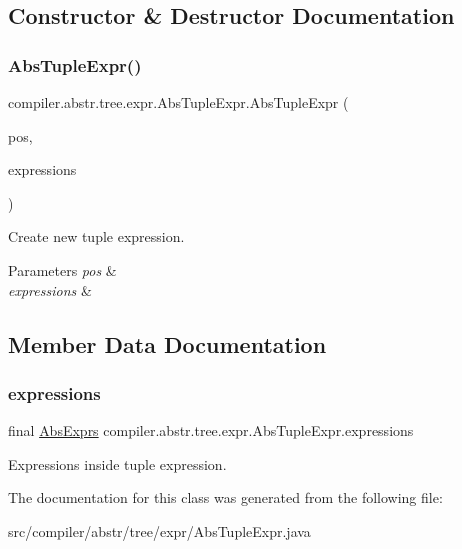 \subsection{Constructor \& Destructor Documentation}
\mbox{\label{classcompiler_1_1abstr_1_1tree_1_1expr_1_1_abs_tuple_expr_a4ee5fcd6edb36f4ed91fb6250d1b4997}} 
\subsubsection{\texorpdfstring{Abs\+Tuple\+Expr()}{AbsTupleExpr()}}
{\footnotesize\ttfamily compiler.\+abstr.\+tree.\+expr.\+Abs\+Tuple\+Expr.\+Abs\+Tuple\+Expr (\begin{DoxyParamCaption}\item[{\hyperlink{classcompiler_1_1_position}{Position}}]{pos,  }\item[{Linked\+List$<$ \hyperlink{classcompiler_1_1abstr_1_1tree_1_1expr_1_1_abs_expr}{Abs\+Expr} $>$}]{expressions }\end{DoxyParamCaption})}

Create new tuple expression. 
\begin{DoxyParams}{Parameters}
{\em pos} & \\
\hline
{\em expressions} & \\
\hline
\end{DoxyParams}


\subsection{Member Data Documentation}
\mbox{\label{classcompiler_1_1abstr_1_1tree_1_1expr_1_1_abs_tuple_expr_a2914b1e474a0a2013b798297e1fc4be3}} 
\subsubsection{\texorpdfstring{expressions}{expressions}}
{\footnotesize\ttfamily final \hyperlink{classcompiler_1_1abstr_1_1tree_1_1_abs_exprs}{Abs\+Exprs} compiler.\+abstr.\+tree.\+expr.\+Abs\+Tuple\+Expr.\+expressions}

Expressions inside tuple expression. 

The documentation for this class was generated from the following file\+:\begin{DoxyCompactItemize}
\item 
src/compiler/abstr/tree/expr/Abs\+Tuple\+Expr.\+java\end{DoxyCompactItemize}
